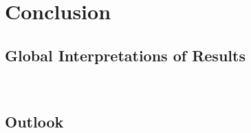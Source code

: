 \chapter{Conclusion}

\section{Global Interpretations of Results}

\begin{figure}[!hbtp]
\centering
     \\
\caption{}
\label{fig:4tau_md_hb}
\end{figure}

\section{Outlook}